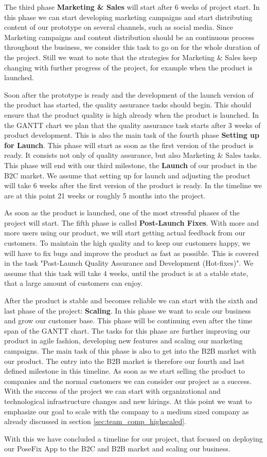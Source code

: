 \p
The third phase \textbf{Marketing \& Sales} will start after 6 weeks of project start.
In this phase we can start developing marketing campaigns and start distributing content of our prototype on several channels, such as social media.
Since Marketing campaigns and content distribution should be an continuous process throughout the business, we consider this task to go on for the whole duration of the project.
Still we want to note that the strategies for Marketing \& Sales keep changing with further progress of the project, for example when the product is launched.

\p
Soon after the prototype is ready and the development of the launch version of the product has started, the quality assurance tasks should begin.
This should ensure that the product quality is high already when the product is launched.
In the GANTT chart we plan that the quality assurance task starts after 3 weeks of product development.
This is also the main task of the fourth phase \textbf{Setting up for Launch}.
This phase will start as soon as the first version of the product is ready.
It consists not only of quality assurance, but also Marketing \& Sales tasks.
This phase will end with our third milestone, the \textbf{Launch} of our product in the B2C market.
We assume that setting up for launch and adjusting the product will take 6 weeks after the first version of the product is ready.
In the timeline we are at this point 21 weeks or roughly 5 months into the project.

\p
As soon as the product is launched, one of the most stressful phases of the project will start.
The fifth phase is called \textbf{Post-Launch Fixes}.
With more and more users using our product, we will start getting actual feedback from our customers.
To maintain the high quality and to keep our customers happy, we will have to fix bugs and improve the product as fast as possible.
This is covered in the task "Post-Launch Quality Assurance and Development (Hot-fixes)".
We assume that this task will take 4 weeks, until the product is at a stable state, that a large amount of customers can enjoy.

\p
After the product is stable and becomes reliable we can start with the sixth and last phase of the project: \textbf{Scaling}.
In this phase we want to scale our business and grow our customer base.
This phase will be continuing even after the time span of the GANTT chart.
The tasks for this phase are further improving our product in agile fashion, developing new features and scaling our marketing campaigns.
The main task of this phase is also to get into the B2B market with our product.
The entry into the B2B market is therefore our fourth and last defined milestone in this timeline.
As soon as we start selling the product to companies and the normal customers we can consider our project as a success.
With the success of the project we can start with organizational and technological infrastructure changes and new hirings.
At this point we want to emphasize our goal to scale with the company to a medium sized company as already discussed in section \ref{sec:team_comp_highscaled}.

\p
With this we have concluded a timeline for our project, that focused on deploying our PoseFix App to the B2C and B2B market and scaling our business.